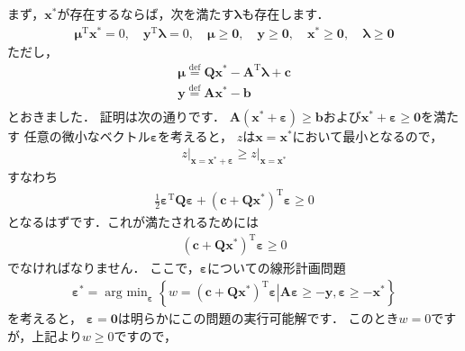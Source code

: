 \documentclass[a4paper]{jsarticle}
\begin{document}
まず，$\boldsymbol{x}^{*}$が存在するならば，次を満たす$\boldsymbol{\lambda}$も存在します．
\begin{align*}
\boldsymbol{\mu}^{\mathrm{T}}\boldsymbol{x}^{*}=0, \quad
\boldsymbol{y}^{\mathrm{T}}\boldsymbol{\lambda}=0, \quad
\boldsymbol{\mu}\geq\boldsymbol{0}, \quad
\boldsymbol{y}\geq\boldsymbol{0}, \quad
\boldsymbol{x}^{*}\geq\boldsymbol{0}, \quad
\boldsymbol{\lambda}\geq\boldsymbol{0}
\end{align*}
ただし，
\begin{align*}
\boldsymbol{\mu}\overset{\mathrm{def}}{=}\boldsymbol{Q}\boldsymbol{x}^{*}-\boldsymbol{A}^{\mathrm{T}}\boldsymbol{\lambda}+\boldsymbol{c} \\
\boldsymbol{y}\overset{\mathrm{def}}{=}\boldsymbol{A}\boldsymbol{x}^{*}-\boldsymbol{b} \\
\end{align*}
とおきました．
証明は次の通りです．
$\boldsymbol{A}(\boldsymbol{x}^{*}+\boldsymbol{\varepsilon})\geq\boldsymbol{b}$および$\boldsymbol{x}^{*}+\boldsymbol{\varepsilon}\geq\boldsymbol{0}$を満たす
任意の微小なベクトル$\boldsymbol{\varepsilon}$を考えると，
$z$は$\boldsymbol{x}=\boldsymbol{x}^{*}$において最小となるので，
\begin{align*}
\left.z\right|_{\boldsymbol{x}=\boldsymbol{x}^{*}+\boldsymbol{\varepsilon}}\geq\left.z\right|_{\boldsymbol{x}=\boldsymbol{x}^{*}}
\end{align*}
すなわち
\begin{align*}
\frac{1}{2}\boldsymbol{\varepsilon}^{\mathrm{T}}\boldsymbol{Q}\boldsymbol{\varepsilon}+
(\boldsymbol{c}+\boldsymbol{Q}\boldsymbol{x}^{*})^{\mathrm{T}}\boldsymbol{\varepsilon}\geq 0
\end{align*}
となるはずです．これが満たされるためには
\begin{align*}
(\boldsymbol{c}+\boldsymbol{Q}\boldsymbol{x}^{*})^{\mathrm{T}}\boldsymbol{\varepsilon}\geq 0
\end{align*}
でなければなりません．
ここで，$\boldsymbol{\varepsilon}$についての線形計画問題
\begin{align*}
\boldsymbol{\varepsilon}^{*}=\mathop{\mathrm{arg~min}}_{\boldsymbol{\varepsilon}}\left\{
w=(\boldsymbol{c}+\boldsymbol{Q}\boldsymbol{x}^{*})^{\mathrm{T}}\boldsymbol{\varepsilon}
\left|
\boldsymbol{A}\boldsymbol{\varepsilon}\geq-\boldsymbol{y},
\boldsymbol{\varepsilon}\geq-\boldsymbol{x}^{*}
\right.
\right\}
\end{align*}
を考えると，
$\boldsymbol{\varepsilon}=\boldsymbol{0}$は明らかにこの問題の実行可能解です．
このとき$w=0$ですが，上記より$w\geq 0$ですので，
\end{document}
